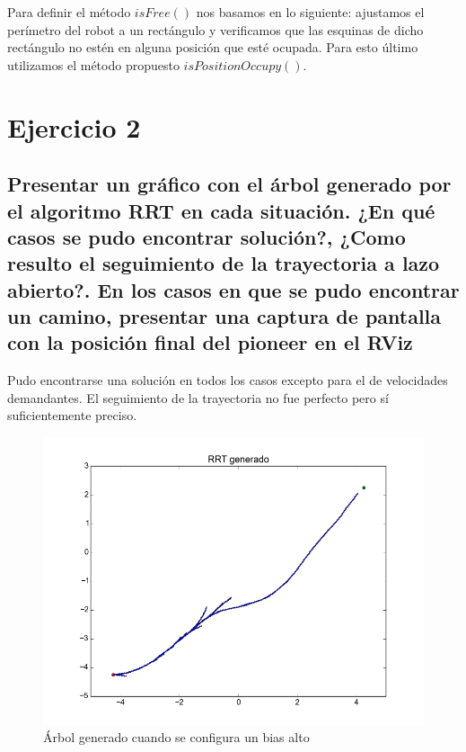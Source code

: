 \documentclass[a4paper]{article}
\theoremstyle{plain}
\theoremstyle{remark}
\theoremstyle{definition}
\begin{document}
Para definir el método $isFree()$ nos basamos en lo siguiente: ajustamos el perímetro del robot a un rectángulo y verificamos que las esquinas de dicho rectángulo no estén en alguna posición que esté ocupada. Para esto último utilizamos el método propuesto $isPositionOccupy()$.

\section{Ejercicio 2}

\subsection{Presentar un gráfico con el árbol generado por el algoritmo RRT en cada situación. ¿En qué casos se pudo encontrar solución?, ¿Como resulto el seguimiento de la trayectoria a lazo abierto?. En los casos en que se pudo encontrar un camino, presentar una captura de pantalla con la posición final del pioneer en el RViz}

Pudo encontrarse una solución en todos los casos excepto para el de velocidades demandantes. El seguimiento de la trayectoria no fue perfecto pero sí suficientemente preciso.

\begin{figure}[ht]
    \begin{center}
        \includegraphics[scale=0.8]{imagenes/arbol_bias_alto.png}
        \caption{Árbol generado cuando se configura un bias alto}
    \end{center}
\end{figure}
\end{document}
